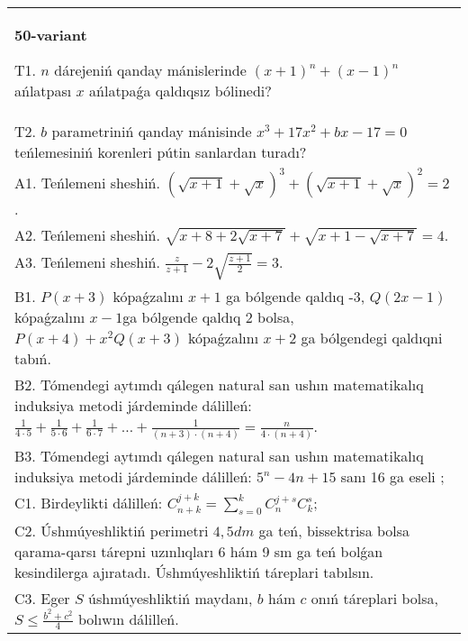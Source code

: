 \documentclass{article}
\begin{document}
\begin{tabular}{m{17cm}}
\textbf{50-variant}
\newline

T1. \(n\) dárejeniń qanday mánislerinde \((x + 1)^{n} + (x - 1)^{n}\) ańlatpası \(x\) ańlatpaǵa qaldıqsız bólinedi? \\
T2. \(b\) parametriniń qanday mánisinde \(x^{3} + 17x^{2} + bx - 17 = 0\) teńlemesiniń korenleri pútin sanlardan turadı? \\
A1. Teńlemeni sheshiń. \((\sqrt{x + 1} + \sqrt{x})^{3} + (\sqrt{x + 1} + \sqrt{x})^{2} = 2\). \\
A2. Teńlemeni sheshiń. \(\sqrt{x + 8 + 2\sqrt{x + 7}} + \sqrt{x + 1 - \sqrt{x + 7}} = 4\). \\
A3. Teńlemeni sheshiń. \(\frac{z}{z + 1} - 2\sqrt{\frac{z + 1}{2}} = 3\). \\
B1. \(P(x + 3)\) kópaǵzalını \(x + 1\) ga bólgende qaldıq -3, \(Q(2x - 1)\) kópaǵzalını \(x - 1\)ga bólgende qaldıq 2 bolsa, \(P(x + 4) + x^{2}Q(x + 3)\) kópaǵzalını \(x + 2\) ga bólgendegi qaldıqni tabıń. \\
B2. Tómendegi aytımdı qálegen natural san ushın matematikalıq induksiya metodi járdeminde dálilleń: \(\frac{1}{4 \cdot 5} + \frac{1}{5 \cdot 6} + \frac{1}{6 \cdot 7} + \ldots + \frac{1}{(n + 3) \cdot (n + 4)} = \frac{n}{4 \cdot (n + 4)}\). \\
B3. Tómendegi aytımdı qálegen natural san ushın matematikalıq induksiya metodi járdeminde dálilleń: \(5^{n} - 4n + 15\) sanı 16 ga eseli ; \\
C1. Birdeylikti dálilleń: \(C_{n + k}^{j + k} = \sum_{s = 0}^{k}C_{n}^{j + s}C_{k}^{s}\); \\
C2. Úshmúyeshliktiń perimetri \(4,5dm\) ga teń, bissektrisa bolsa qarama-qarsı tárepni uzınlıqları 6 hám 9 sm ga teń bolǵan kesindilerga ajıratadı. Úshmúyeshliktiń táreplari tabılsın. \\
C3. Eger \(S\) úshmúyeshliktiń maydanı, \(b\) hám \(c\) onıń táreplari bolsa, \(S \leq \frac{b^{2} + c^{2}}{4}\) bolıwın dálilleń. \\

\end{tabular}
\vspace{1cm}
\end{document}
